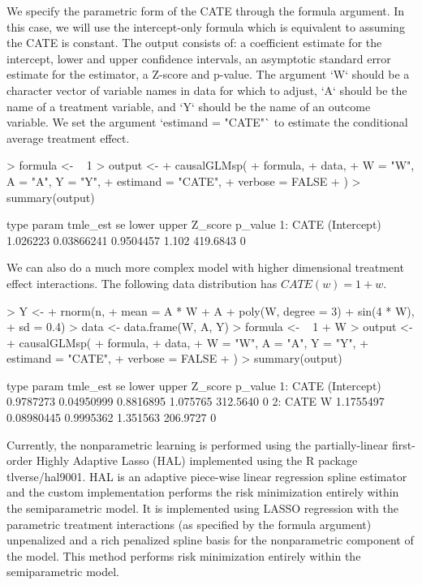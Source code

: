 \documentclass{article}
\begin{document}
We specify the parametric form of the CATE through the formula argument. In this case, we will use the intercept-only formula which is equivalent to assuming the CATE is constant.  The output consists of:
a coefficient estimate for the intercept, lower and upper confidence intervals, an asymptotic standard error estimate for the estimator, a Z-score and p-value. The argument `W` should be a character vector of variable names in data for which to adjust, `A` should be the name of a treatment variable, and `Y` should be the name of an outcome variable. We set the argument `estimand = "CATE"` to estimate the conditional average treatment effect.
\begin{Schunk}
\begin{Sinput}
> formula <- ~ 1
> output <-
+   causalGLMsp(
+     formula,
+     data,
+     W = "W", A = "A", Y = "Y",
+     estimand = "CATE",
+     verbose = FALSE
+   )
> summary(output) 
\end{Sinput}
\begin{Soutput}
   type       param tmle_est         se     lower upper  Z_score p_value
1: CATE (Intercept) 1.026223 0.03866241 0.9504457 1.102 419.6843       0
\end{Soutput}
\end{Schunk}
We can also do a much more complex model with higher dimensional treatment effect interactions. The following data distribution has $CATE(w) = 1 + w$.  
\begin{Schunk}
\begin{Sinput}
> Y <-
+   rnorm(n,
+         mean = A * W + A + poly(W, degree = 3) + sin(4 * W),
+         sd = 0.4)
> data <- data.frame(W, A, Y)
> formula <- ~ 1 + W
> output <-
+   causalGLMsp(
+     formula,
+     data,
+     W = "W", A = "A", Y = "Y",
+     estimand = "CATE",
+     verbose = FALSE
+   )
> summary(output) 
\end{Sinput}
\begin{Soutput}
   type       param  tmle_est         se     lower    upper  Z_score p_value
1: CATE (Intercept) 0.9787273 0.04950999 0.8816895 1.075765 312.5640       0
2: CATE           W 1.1755497 0.08980445 0.9995362 1.351563 206.9727       0
\end{Soutput}
\end{Schunk}


Currently, the nonparametric learning is performed using the partially-linear first-order Highly Adaptive Lasso (HAL) implemented using the R package tlverse/hal9001. HAL is an adaptive piece-wise linear regression spline estimator and the custom implementation performs the risk minimization entirely within the semiparametric model. It is implemented using LASSO regression with the parametric treatment interactions (as specified by the formula argument) unpenalized and a rich penalized spline basis for the nonparametric component of the model. This method performs risk minimization entirely within the semiparametric model.
\end{document}
